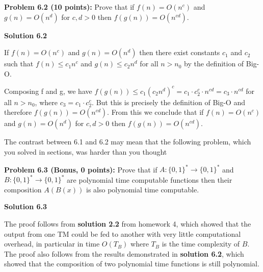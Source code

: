 \documentclass[11pt]{article}
\begin{document}
\newpage

\textbf{Problem 6.2 (10 points):}  Prove that if $f(n) = O(n^c)$ and $g(n) = O(n^d)$ for $c,d > 0$ then $f(g(n)) = O(n^{cd})$. 

\textbf{Solution 6.2}

If $f(n) = O(n^c)$ and $g(n) = O(n^d)$ then there exist constants $c_1$ and $c_2$ such that $f(n) \leq c_1 n^c$ and $g(n) \leq c_2 n^d$ for all $n > n_0$ by the definition of Big-O.

Composing f and g, we have $f(g(n)) \leq c_1(c_2 n^d)^c = c_1 \cdot c_2^c \cdot n^{cd} = c_3 \cdot n^{cd}$ for all $n > n_0$, where $c_3 = c_1 \cdot c_2^c$. But this is precisely the definition of Big-O and therefore $f(g(n)) = O(n^{cd})$. From this we conclude that if $f(n) = O(n^c)$ and $g(n) = O(n^d)$ for $c,d > 0$ then $f(g(n)) = O(n^{cd})$.

\newpage

The contrast between 6.1 and 6.2 may mean that the following problem, which you solved in sections, was harder than you thought

\textbf{Problem 6.3 (Bonus, 0 points):}  Prove that if $A:\{0,1\}^* \to \{0,1\}^*$ and $B:\{0,1\}^* \to \{0,1\}^*$ are polynomial time computable functions then their composition $A(B(x))$ is also polynomial time computable.

\textbf{Solution 6.3}

The proof follows from \textbf{solution 2.2} from homework 4, which showed that the output from one TM could be fed to another with very little computational overhead, in particular in time $O(T_B)$ where $T_B$ is the time complexity of $B$. The proof also follows from the results demonstrated in \textbf{solution 6.2}, which showed that the composition of two polynomial time functions is still polynomial.
\end{document}
